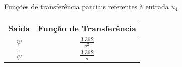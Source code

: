 \begin{quadro}[!htb]
    \centering
    \caption{Funções de transferência parciais referentes à entrada $u_4$\label{qua:resultados_quadro_tfs_u4}}
    \begin{tabular}{|c|c|}
        \hline
        \textbf{Saída} & 
        \textbf{Função de Transferência} \\
        \hline
            $\psi$ &
            $\frac{3.362}{s^2}$ \\[1ex]
        \hline
            $\dot{\psi}$ &
            $\frac{3.362}{s}$ \\[1ex]
        \hline
    \end{tabular}
\end{quadro}
